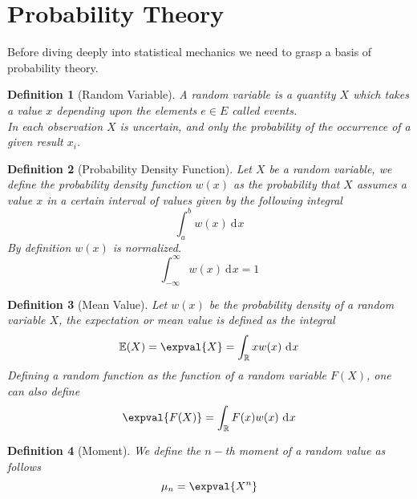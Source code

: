 \documentclass[a4paper, 11pt]{book}
\newcommand{\1}{\opr{\mathds{1}}}
\newcommand{\diff}[2][]{\ \mathrm{d}^{#1}#2}
\newcommand{\R}{\mathbb{R}}
\theoremstyle{plain}
\newtheorem{defn}{Definition}
\begin{document}
	\section{Probability Theory}
	Before diving deeply into statistical mechanics we need to grasp a basis of probability theory.
	\begin{defn}[Random Variable]
		A random variable is a quantity $X$ which takes a value $x$ depending upon the elements $e\in E$ called events.\\
		In each observation $X$ is uncertain, and only the probability of the occurrence of a given result $x_i$.
	\end{defn}
	\begin{defn}[Probability Density Function]
		Let $X$ be a random variable, we define the probability density function $w(x)$ as the probability that $X$ assumes a value $x$ in a certain interval of values given by the following integral
		\begin{equation*}
			\int_{a}^{b}w(x)\diff{x}
		\end{equation*}
		By definition $w(x)$ is normalized.
		\begin{equation*}
			\int_{-\infty}^{\infty}w(x)\diff{x}=1
		\end{equation*}
	\end{defn}
	\begin{defn}[Mean Value]
		Let $w(x)$ be the probability density of a random variable $X$, the expectation or mean value is defined as the integral
		\begin{equation*}
			\mathbb{E}(X)=\expval{X}=\int_{\mathbb{R}}xw(x)\diff{x}
		\end{equation*}
		Defining a \textit{random function} as the function of a random variable $F(X)$, one can also define
		\begin{equation*}
			\expval{F(X)}=\int_{\R}F(x)w(x)\diff{x}
		\end{equation*}
	\end{defn}
	\begin{defn}[Moment]
		We define the $n-$th moment of a random value as follows
		\begin{equation*}
			\mu_n=\expval{X^n}
		\end{equation*}
	\end{defn}
\end{document}
